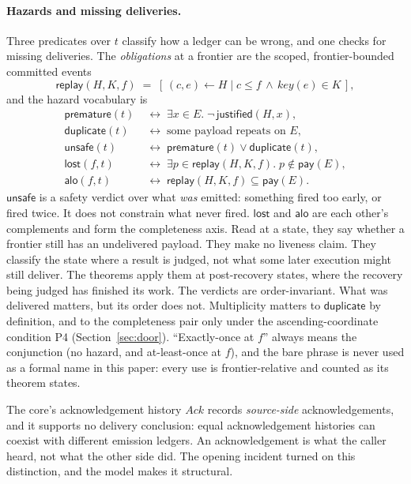 \documentclass[sigplan,10pt]{acmart}
\theoremstyle{plain}
\theoremstyle{definition}
\newcommand{\replay}{\mathsf{replay}}      %
\newcommand{\scope}{K}                     %
\newcommand{\pay}{\mathsf{pay}}            %
\newcommand{\just}{\mathsf{justified}}
\newcommand{\prem}{\mathsf{premature}}
\newcommand{\dupl}{\mathsf{duplicate}}
\newcommand{\unsafe}{\mathsf{unsafe}}
\newcommand{\lostp}{\mathsf{lost}}
\newcommand{\alo}{\mathsf{alo}}            %
\begin{document}
\paragraph{Hazards and missing deliveries.}
Three predicates over $t$ classify how a ledger can be wrong, and one
checks for missing deliveries. The \emph{obligations} at a frontier are the
scoped, frontier-bounded committed events
\[
  \replay(H,\scope,f) \;=\;
  [\, (c,e) \leftarrow H \mid c \le f \,\wedge\, \mathit{key}(e) \in \scope \,],
\]
and the hazard vocabulary is
\[
\begin{aligned}
  \prem(t) \;&\longleftrightarrow\;
     \exists x \in E .\; \neg\, \just(H, x),\\
  \dupl(t) \;&\longleftrightarrow\;
     \text{some payload repeats on } E,\\
  \unsafe(t) \;&\longleftrightarrow\; \prem(t) \vee \dupl(t),\\
  \lostp(f,t) \;&\longleftrightarrow\;
     \exists p \in \replay(H,\scope,f) .\; p \notin \pay(E),\\
  \alo(f,t) \;&\longleftrightarrow\;
     \replay(H,\scope,f) \subseteq \pay(E).
\end{aligned}
\]
$\unsafe$ is a safety verdict over what \emph{was} emitted: something
fired too early, or fired twice. It does not constrain what never
fired.
$\lostp$ and $\alo$ are each other's complements and form the
completeness axis. Read at a state, they say whether a frontier still
has an undelivered payload. They make no liveness claim. They classify the
state where a result is judged, not what some later
execution might still deliver. The theorems apply them at
post-recovery states, where the recovery being judged has finished its
work. The verdicts are order-invariant. What was delivered matters,
but its order does not. Multiplicity matters to $\dupl$ by
definition, and to the completeness pair only under the
ascending-coordinate condition P4 (Section~\ref{sec:door}).
``Exactly-once at $f$'' always means the conjunction (no hazard, and
at-least-once at $f$), and the bare phrase is never used as a formal
name in this paper: every use is frontier-relative and counted as its
theorem states.

The core's acknowledgement history $\mathit{Ack}$ records
\emph{source-side} acknowledgements, and it supports no delivery
conclusion: equal acknowledgement histories can coexist with different
emission ledgers. An acknowledgement is what the caller heard, not
what the other side did. The opening incident turned on this
distinction, and the model makes it structural.
\end{document}
